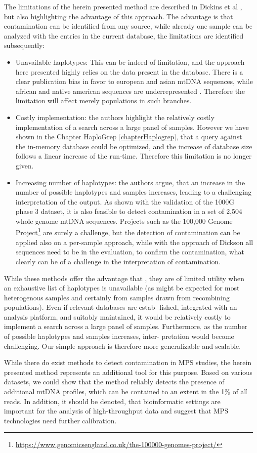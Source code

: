 The limitations of the herein presented method are described in Dickins et al \cite{Dickins2014}, but also highlighting the advantage of this approach. The advantage is that contamination can be identified from any source, while already one sample can be analyzed with the entries in the current database, the limitations are identified subsequently:
\begin{itemize}
\item Unavailable haplotypes: This can be indeed of limitation, and the approach here presented highly relies on the data present in the database. There is a clear publication bias in favor to european and asian mtDNA sequences, while african and native american sequences are underrepresented \cite{Fendt2011}. Therefore the limitation will affect merely populations in such branches. 
\item Costly implementation: the authors highlight the relatively costly implementation of a search across a large panel of samples. However we have shown in the Chapter HaploGrep \ref{chapterHaplogrep}, that a query against the in-memory database could be optimized, and the increase of database size follows a linear increase of the run-time. Therefore this limitation is no longer given.
\item Increasing number of haplotypes: the authors argue, that an increase in the number of possible haplotypes and samples increases, leading to a challenging interpretation of the output. As shown with the validation of the 1000G phase 3 dataset, it is also feasible to detect contamination in a set of 2,504 whole genome mtDNA sequences. Projects such as the 100,000 Genome Project\footnote{\url{https://www.genomicsengland.co.uk/the-100000-genomes-project/}} are surely a challenge, but the detection of contamination can be applied also on a per-sample approach, while with the approach of Dickson all sequences need to be in the evaluation, to confirm the contamination, what clearly can be of a challenge in the interpretation of contamination. 
\end{itemize}
While these methods offer the advantage that , they are of limited utility when an exhaustive list of haplotypes is unavailable (as might be expected for most heterogenous samples and certainly from samples drawn from recombining populations). Even if relevant databases are estab- lished, integrated with an analysis platform, and suitably maintained, it would be relatively costly to implement a search across a large panel of samples. Furthermore, as the number of possible haplotypes and samples increases, inter- pretation would become challenging. Our simple approach is therefore more generalizable and scalable.

While there do exist methods to detect contamination in MPS studies, the herein presented method represents an additional tool for this purpose. Based on various datasets, we could show that the method reliably detects the presence of additional mtDNA profiles, which can be contained to an extent in the 1\% of all reads. 
In addition, it should be denoted, that bioinformatic settings are important for the analysis of high-throughput data and suggest that MPS technologies need further calibration.

